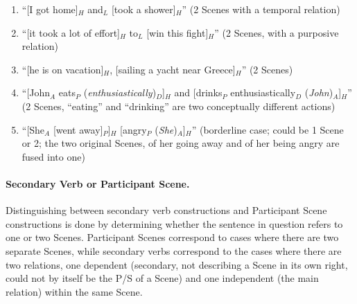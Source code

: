 \documentclass[11pt]{article}
\newcommand{\be}{\begin{enumerate}}
\newcommand{\ee}{\end{enumerate}}
\newcommand{\dd}[1]{{\color{blue}{#1}}}
\newcommand{\rem}[1]{{(\it #1})}
\begin{document}
\be
\item
  ``[I got home]$_H$ and$_L$ [took a shower]$_H$'' (2 Scenes with a temporal relation)
\item
  ``[it took a lot of effort]$_H$ to$_L$ [win this fight]$_H$'' (2 Scenes, with a purposive relation)
\item
  ``[he is on vacation]$_H$, [sailing a yacht near Greece]$_H$'' (2 Scenes)
\item
  ``[John$_A$ eats$_P$ \rem{enthusiastically}$_D$]$_H$ and [drinks$_P$ enthusiastically$_D$ \rem{John}$_A$]$_H$'' (2 Scenes, ``eating'' and ``drinking'' are two conceptually different actions)
\item
``[She$_A$ [went away]$_P$]$_H$ [angry$_P$ \rem{She}$_A$]$_{H}$'' (borderline case; could be 1 Scene or 2; the two original Scenes, of her going away and of her being angry are fused into one)
\ee

\paragraph{Secondary Verb or Participant Scene.} Distinguishing between secondary verb constructions and Participant Scene constructions is done by determining whether the sentence in question refers to one or two Scenes. 
Participant Scenes correspond to cases where there are two separate Scenes, while secondary verbs correspond to the cases where there are two relations, 
one dependent (secondary, not describing a Scene in its own right, could not by itself be the P/S of a Scene) and one independent (the main relation) within the same Scene.
\end{document}
